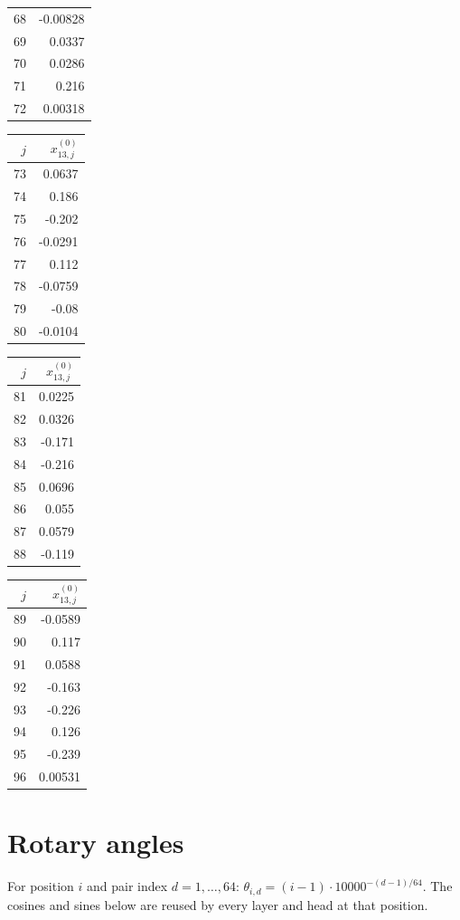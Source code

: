{\begin{tabular}[t]{r|r}
68 & -0.00828 \\
69 & 0.0337 \\
70 & 0.0286 \\
71 & 0.216 \\
72 & 0.00318
\end{tabular}\kern4pt
\begin{tabular}[t]{r|r}
$j$ & $x^{(0)}_{13,j}$ \\\hline
73 & 0.0637 \\
74 & 0.186 \\
75 & -0.202 \\
76 & -0.0291 \\
77 & 0.112 \\
78 & -0.0759 \\
79 & -0.08 \\
80 & -0.0104
\end{tabular}\kern4pt
\begin{tabular}[t]{r|r}
$j$ & $x^{(0)}_{13,j}$ \\\hline
81 & 0.0225 \\
82 & 0.0326 \\
83 & -0.171 \\
84 & -0.216 \\
85 & 0.0696 \\
86 & 0.055 \\
87 & 0.0579 \\
88 & -0.119
\end{tabular}\kern4pt
\begin{tabular}[t]{r|r}
$j$ & $x^{(0)}_{13,j}$ \\\hline
89 & -0.0589 \\
90 & 0.117 \\
91 & 0.0588 \\
92 & -0.163 \\
93 & -0.226 \\
94 & 0.126 \\
95 & -0.239 \\
96 & 0.00531
\end{tabular}}

\section{Rotary angles}

For position $i$ and pair index $d=1,\dots,64$: $\theta_{i,d} = (i-1)\cdot 10000^{-(d-1)/64}$. The cosines and sines below are reused by every layer and head at that position.

